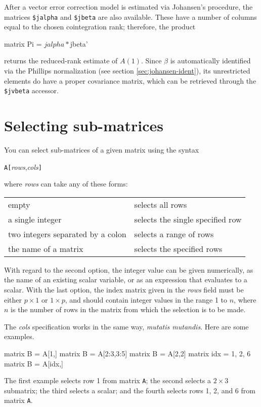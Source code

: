 After a vector error correction model is estimated via Johansen's
procedure, the matrices \verb|$jalpha| and \verb|$jbeta| are
also available. These have a number of columns equal to the chosen
cointegration rank; therefore, the product
\begin{code}
matrix Pi = $jalpha * $jbeta'
\end{code}
returns the reduced-rank estimate of $A(1)$. Since $\beta$ is
automatically identified via the Phillips normalization (see section
\ref{sec:johansen-ident}), its unrestricted elements do have a proper
covariance matrix, which can be retrieved through the
\verb|$jvbeta| accessor.

\section{Selecting sub-matrices}
\label{matrix-sub}

You can select sub-matrices of a given matrix using the syntax

\texttt{A[}\textsl{rows},\textsl{cols}\texttt{]}

where \textsl{rows} can take any of these forms:

\begin{center}
\begin{tabular}{ll}
empty & selects all rows \\
a single integer & selects the single specified row \\
two integers separated by a colon & selects a range of rows \\
the name of a matrix & selects the specified rows \\
\end{tabular}
\end{center}

With regard to the second option, the integer value can be given
numerically, as the name of an existing scalar variable, or as an
expression that evaluates to a scalar.  With the last option, the
index matrix given in the \textsl{rows} field must be either $p\times
1$ or $1\times p$, and should contain integer values in the range 1 to
$n$, where $n$ is the number of rows in the matrix from which the
selection is to be made.

The \textsl{cols} specification works in the same way, \textit{mutatis
  mutandis}.  Here are some examples.
%
\begin{code}
matrix B = A[1,]
matrix B = A[2:3,3:5]
matrix B = A[2,2]
matrix idx = { 1, 2, 6 }
matrix B = A[idx,]
\end{code}
%
The first example selects row 1 from matrix \texttt{A}; the second
selects a $2\times 3$ submatrix; the third selects a scalar; and
the fourth selects rows 1, 2, and 6 from matrix \texttt{A}.

